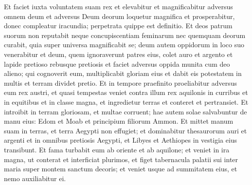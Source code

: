 \begin{biblechapter}
\verse Et faciet iuxta voluntatem suam rex et elevabitur et magnificabitur adversus omnem deum et adversus Deum deorum loquetur magnifica et prosperabitur, donec compleatur iracundia; perpetrata quippe est definitio. 
\verse Et deos patrum suorum non reputabit neque concupiscentiam feminarum nec quemquam deorum curabit, quia super universa magnificabit se; 
\verse deum autem oppidorum in loco suo venerabitur et deum, quem ignoraverunt patres eius, colet auro et argento et lapide pretioso rebusque pretiosis 
\verse et faciet adversus oppida munita cum deo alieno; qui cognoverit eum, multiplicabit gloriam eius et dabit eis potestatem in multis et terram dividet pretio. 
\verse Et in tempore praefinito proeliabitur adversus eum rex austri, et quasi tempestas veniet contra illum rex aquilonis in curribus et in equitibus et in classe magna, et ingredietur terras et conteret et pertransiet. 
\verse Et introibit in terram gloriosam, et multae corruent; hae autem solae salvabuntur de manu eius: Edom et Moab et principium filiorum Ammon. 
\verse Et mittet manum suam in terras, et terra Aegypti non effugiet; 
\verse et dominabitur thesaurorum auri et argenti et in omnibus pretiosis Aegypti, et Libyes et Aethiopes in vestigia eius transibunt. 
\verse Et fama turbabit eum ab oriente et ab aquilone; et veniet in ira magna, ut conterat et interficiat plurimos, 
\verse et figet tabernacula palatii sui inter maria super montem sanctum decoris; et veniet usque ad summitatem eius, et nemo auxiliabitur ei. 
\end{biblechapter}

